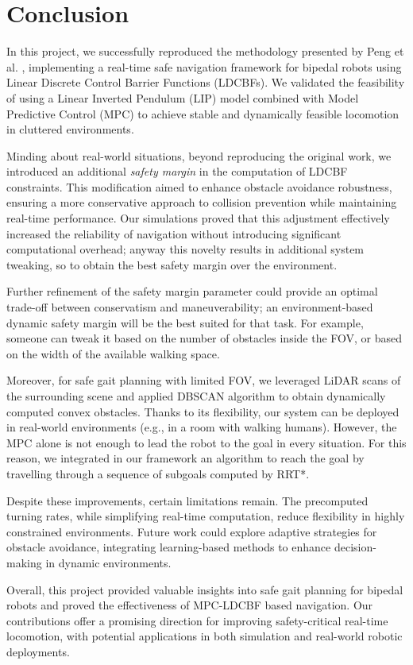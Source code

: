 \section{Conclusion}\label{sec:conclusions}
In this project, we successfully reproduced the methodology presented by Peng et al. \cite{peng_main_paper}, implementing a real-time
safe navigation framework for bipedal robots using Linear Discrete Control Barrier Functions (LDCBFs).
We validated the feasibility of using a Linear Inverted Pendulum (LIP) model combined with Model Predictive Control (MPC) to achieve stable and dynamically feasible locomotion in cluttered environments.

Minding about real-world situations, beyond reproducing the original work, we introduced an additional
\textit{safety margin} in the computation of LDCBF constraints.
This modification aimed to enhance obstacle avoidance robustness,
ensuring a more conservative approach to collision prevention while maintaining real-time performance.
Our simulations proved that this adjustment effectively increased the reliability of navigation without
introducing significant computational overhead; anyway this novelty results in additional system tweaking, so to
obtain the best safety margin over the environment.

Further refinement of the safety margin parameter could provide an optimal trade-off between conservatism and
maneuverability; an environment-based dynamic safety margin will be the best suited for that task.
For example, someone can tweak it based on the number of obstacles inside the FOV, or based on the width of
the available walking space.

Moreover, for safe gait planning with limited FOV, we leveraged LiDAR scans of the surrounding scene and applied DBSCAN
algorithm to obtain dynamically computed convex obstacles.
Thanks to its flexibility, our system can be deployed in real-world environments (e.g., in a room with walking humans).
However, the MPC alone is not enough to lead the robot to the goal in every situation. For this reason, we integrated in our framework an algorithm to reach the goal by travelling through a sequence of subgoals computed by RRT*.

Despite these improvements, certain limitations remain.
The precomputed turning rates, while simplifying real-time computation, reduce flexibility in highly constrained environments.
Future work could explore adaptive strategies for obstacle avoidance, integrating learning-based methods to enhance decision-making in dynamic environments.

Overall, this project provided valuable insights into safe gait planning for bipedal robots and proved the effectiveness of MPC-LDCBF based navigation.
Our contributions offer a promising direction for improving safety-critical real-time locomotion, with potential applications in both simulation and real-world robotic deployments.